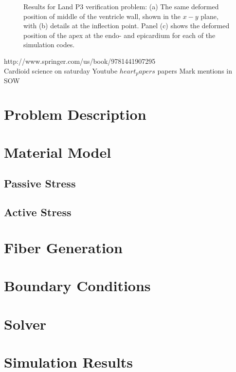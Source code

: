 \begin{figure}[ht!]
%
\caption{Results for Land P3 verification problem: (a) The same deformed position of middle of the ventricle wall, shown in the $x-y$ plane, with (b) details at the inflection point. Panel (c) shows the deformed position of the apex at the endo- and epicardium for each of the simulation codes.}
\label{fig:land3.2}
\end{figure}

{http://www.springer.com/us/book/9781441907295} \\
Cardioid science on saturday Youtube
$heart_papers$
papers Mark mentions in SOW

\section{Problem Description}
\label{Problem Description}

\section{Material Model}
\label{Material Model}

\subsection{Passive Stress}
\label{Passive Stress}

\subsection{Active Stress}
\label{Active Stress}

\section{Fiber Generation}
\label{Fiber Generation}

\section{Boundary Conditions}
\label{Boundary Conditions}

\section{Solver}
\label{Solver}

\section{Simulation Results}
\label{Simulation Results}

